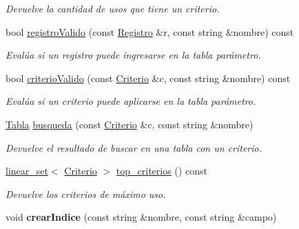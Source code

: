 \begin{DoxyCompactItemize}
\begin{DoxyCompactList}\small\item\em Devuelve la cantidad de usos que tiene un criterio. \end{DoxyCompactList}\item 
bool \hyperlink{classBaseDeDatos_a451ef7b34a2ff9d395da10745266b703}{registro\+Valido} (const \hyperlink{classRegistro}{Registro} \&r, const string \&nombre) const 
\begin{DoxyCompactList}\small\item\em Evalúa si un registro puede ingresarse en la tabla parámetro. \end{DoxyCompactList}\item 
bool \hyperlink{classBaseDeDatos_a43f25f2c23796d5133c75f1973898b36}{criterio\+Valido} (const \hyperlink{classBaseDeDatos_a6742a222e87623bc92a810a693fb337b}{Criterio} \&c, const string \&nombre) const 
\begin{DoxyCompactList}\small\item\em Evalúa si un criterio puede aplicarse en la tabla parámetro. \end{DoxyCompactList}\item 
\hyperlink{classTabla}{Tabla} \hyperlink{classBaseDeDatos_aa0676f34e537e650095e55b3eef852cb}{busqueda} (const \hyperlink{classBaseDeDatos_a6742a222e87623bc92a810a693fb337b}{Criterio} \&c, const string \&nombre)
\begin{DoxyCompactList}\small\item\em Devuelve el resultado de buscar en una tabla con un criterio. \end{DoxyCompactList}\item 
\hyperlink{classlinear__set}{linear\+\_\+set}$<$ \hyperlink{classBaseDeDatos_a6742a222e87623bc92a810a693fb337b}{Criterio} $>$ \hyperlink{classBaseDeDatos_a907976b069e65a933e025035d887a3b5}{top\+\_\+criterios} () const 
\begin{DoxyCompactList}\small\item\em Devuelve los criterios de máximo uso. \end{DoxyCompactList}\item 
\hypertarget{classBaseDeDatos_a9ec2a34b6864548e9e34d2f3142daa44}{void {\bfseries crear\+Indice} (const string \&nombre, const string \&campo)}\label{classBaseDeDatos_a9ec2a34b6864548e9e34d2f3142daa44}

\end{DoxyCompactItemize}
